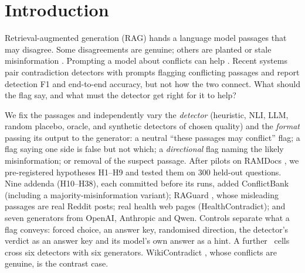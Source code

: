 \section{Introduction}

Retrieval-augmented generation (RAG) \citep{lewis2020rag} hands a language model passages that may disagree. Some
disagreements are genuine; others are planted or stale misinformation \citep{zou2025poisonedrag,wang2025madam}. Prompting a model about conflicts can help \citep{cattan2025conflicts}. Recent systems pair contradiction
detectors with prompts flagging conflicting passages \citep{wang2026conflictrag} and report detection F1 and end-to-end accuracy, but not how the two connect. What should the flag say, and what must the
detector get right for it to help?

We fix the passages and independently vary the \emph{detector} (heuristic, NLI, LLM, random placebo,
oracle, and synthetic detectors of chosen quality) and the \emph{format} passing its output to the generator: a
neutral ``these passages may conflict'' flag; a flag saying one side is false but not which; a
\emph{directional} flag naming the likely misinformation; or removal of the suspect passage. After pilots on
RAMDocs \citep{wang2025madam}, we pre-registered hypotheses H1--H9 and tested them on 300 held-out questions.
Nine addenda (H10--H38), each committed before its runs, added ConflictBank \citep{su2024conflictbank}
(including a majority-misinformation variant); RAGuard \citep{zeng2025raguard}, whose
misleading passages are real Reddit posts; real health web pages (HealthContradict); and seven generators from OpenAI, Anthropic and Qwen. Controls separate what a
flag conveys: forced choice, an answer key, randomised direction, the detector's verdict as an answer key and its model's own answer as
a hint. A further \hTwentyFourCells\ cells cross six detectors with six generators. WikiContradict \citep{hou2024wikicontradict}, whose conflicts are genuine, is the contrast case.

